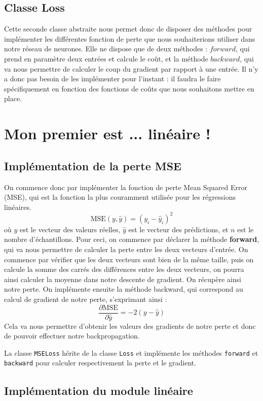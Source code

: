 \documentclass{article}
\begin{document}
\subsection{Classe Loss}
Cette seconde classe abstraite nous permet donc de disposer des méthodes pour implémenter les différentes fonction de perte que nous souhaiterions utiliser dans notre réseau de neurones. Elle ne dispose que de deux méthodes : $forward$, qui prend en paramètre deux entrées et calcule le coût, et la méthode $backward$, qui va nous permettre de calculer le coup du gradient par rapport à une entrée. Il n'y a donc pas besoin de les implémenter pour l'instant : il faudra le faire spécifiquement en fonction des fonctions de coûts que nous souhaitons mettre en place.

\section{Mon premier est ... linéaire !}
\subsection{Implémentation de la perte MSE}
On commence donc par implémenter la fonction de perte Mean Squared Error (MSE), qui est la fonction la plus couramment utilisée pour les régressions linéaires.\[
\text{MSE}(y, \hat{y}) = (y_i - \hat{y}_i)^2
\]
où \(y\) est le vecteur des valeurs réelles, \(\hat{y}\) est le vecteur des prédictions, et \(n\) est le nombre d'échantillons. Pour ceci, on commence par déclarer la méthode \textbf{forward}, qui va nous permettre de calculer la perte entre les deux vecteurs d'entrée. On commence par vérifier que les deux vecteurs sont bien de la même taille, puis on calcule la somme des carrés des différences entre les deux vecteurs, on pourra ainsi calculer la moyenne dans notre descente de gradient. On récupère ainsi notre perte. On implémente ensuite la méthode backward, qui correspond au calcul de gradient de notre perte, s'exprimant ainsi :
\[
\frac{\partial \text{MSE}}{\partial \hat{y}} = -{2} (y - \hat{y})
\]
Cela va nous permettre d'obtenir les valeurs des gradients de notre perte et donc de pouvoir effectuer notre backpropagation.

La classe \texttt{MSELoss} hérite de la classe \texttt{Loss} et implémente les méthodes \texttt{forward} et \texttt{backward} pour calculer respectivement la perte et le gradient.

\subsection{Implémentation du module linéaire}
\end{document}
